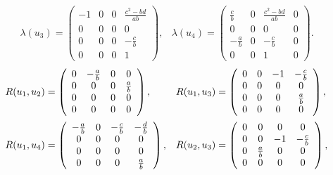 \documentclass{amsart}
\theoremstyle{plain}
\theoremstyle{remark}
\begin{document}
{{\begin{equation}
\begin{array}{ll}
\lambda(u_3)=\left( \begin {array}{cccc} -1&0&0&{\frac {{c}^{2}-bd}{ab}}\\0&0&0&0\\0&0&0&-{\frac {c}{b}}\\0&0&0&1\end {array} \right), &\lambda(u_4)=\left( \begin {array}{cccc} {\frac {c}{b}}&0&{\frac {{c}^{2}-bd}{ab}}&0\\0&0&0&0\\-{\frac {a}{b}}&0&-{\frac {c}{b}}&0\\0&0&1&0\end {array} \right). 
\end{array}
\end{equation}
%
%
\begin{equation}\label{RA3}
\begin{array}{ll}
R(u_1,u_2) =\left( \begin {array}{cccc} 0&-{\frac {a}{b}}&0&0\\ 0&0&0&{\frac {a}{b}}\\ 0&0&0&0\\ 0&0&0&0\end {array} \right), &R(u_1,u_3)=\left( \begin {array}{cccc} 0&0&-1&-{\frac {c}{b}}\\ 0&0&0&0\\ 0&0&0&{\frac {a}{b}}\\ 0&0&0&0\end {array} \right), \vspace{2mm}\\

R(u_1,u_4)=\left( \begin {array}{cccc} -{\frac {a}{b}}&0&-{\frac {c}{b}}&-{\frac {d}{b}}\\0&0&0&0\\ 0&0&0&0\\ 0&0&0&{\frac {a}{b}}\end {array} \right), &R(u_2,u_3)=\left( \begin {array}{cccc} 0&0&0&0\\ 0&0&-1&-{\frac {c}{b}}\\ 0&{\frac {a}{b}}&0&0\\ 0&0&0&0\end {array} \right), 
\vspace{2mm}\\


\end{array}
\end{equation}}}
\end{document}
